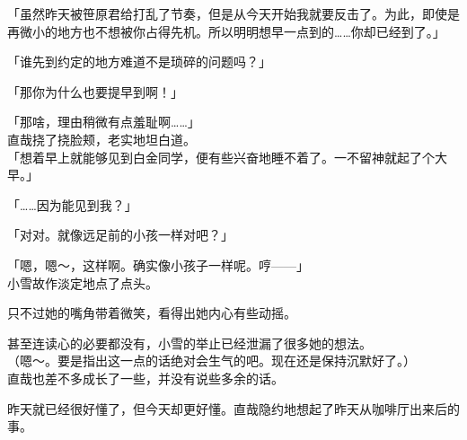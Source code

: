 「虽然昨天被笹原君给打乱了节奏，但是从今天开始我就要反击了。为此，即使是再微小的地方也不想被你占得先机。所以明明想早一点到的……你却已经到了。」

「谁先到约定的地方难道不是琐碎的问题吗？」

「那你为什么也要提早到啊！」

「那啥，理由稍微有点羞耻啊……」\\

直哉挠了挠脸颊，老实地坦白道。\\

「想着早上就能够见到白金同学，便有些兴奋地睡不着了。一不留神就起了个大早。」

「……因为能见到我？」

「对对。就像远足前的小孩一样对吧？」

「嗯，嗯～，这样啊。确实像小孩子一样呢。哼——」\\

小雪故作淡定地点了点头。

只不过她的嘴角带着微笑，看得出她内心有些动摇。

甚至连读心的必要都没有，小雪的举止已经泄漏了很多她的想法。\\

（嗯～。要是指出这一点的话绝对会生气的吧。现在还是保持沉默好了。）\\

直哉也差不多成长了一些，并没有说些多余的话。

昨天就已经很好懂了，但今天却更好懂。直哉隐约地想起了昨天从咖啡厅出来后的事。\\

